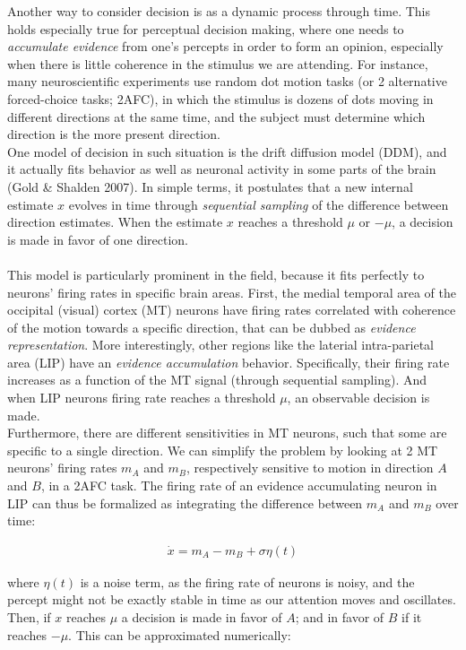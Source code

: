 \documentclass{article}
\begin{document}
\indent\indent Another way to consider decision is as a dynamic process through time. This holds especially true for perceptual decision making, where one needs to \textit{accumulate evidence} from one's percepts in order to form an opinion, especially when there is little coherence in the stimulus we are attending. For instance, many neuroscientific experiments use random dot motion tasks (or 2 alternative forced-choice tasks; 2AFC), in which the stimulus is dozens of dots moving in different directions at the same time, and the subject must determine which direction is the more present direction.
\\
\indent One model of decision in such situation is the drift diffusion model (DDM), and it actually fits behavior as well as neuronal activity in some parts of the brain (Gold \& Shalden 2007). In simple terms, it postulates that a new internal estimate $x$ evolves in time through \textit{sequential sampling} of the difference between direction estimates. When the estimate $x$ reaches a threshold $\mu$ or $-\mu$, a decision is made in favor of one direction.
\\ \\
\indent This model is particularly prominent in the field, because it fits perfectly to neurons' firing rates in specific brain areas. First, the medial temporal area of the occipital (visual) cortex (MT) neurons have firing rates correlated with coherence of the motion towards a specific direction, that can be dubbed as \textit{evidence representation}. More interestingly, other regions like the laterial intra-parietal area (LIP) have an \textit{evidence accumulation} behavior. Specifically, their firing rate increases as a function of the MT signal (through sequential sampling). And when LIP neurons firing rate reaches a threshold $\mu$, an observable decision is made.
\\
\indent Furthermore, there are different sensitivities in MT neurons, such that some are specific to a single direction. We can simplify the problem by looking at 2 MT neurons' firing rates $m_A$ and $m_B$, respectively sensitive to motion in direction $A$ and $B$, in a 2AFC task. The firing rate of an evidence accumulating neuron in LIP can thus be formalized as integrating the difference between $m_A$ and $m_B$ over time:

\begin{align*}
\dot{x} = m_A - m_B + \sigma \eta(t)
\end{align*}

\noindent where $\eta(t)$ is a noise term, as the firing rate of neurons is noisy, and the percept might not be exactly stable in time as our attention moves and oscillates. Then, if $x$ reaches $\mu$ a decision is made in favor of $A$; and in favor of $B$ if it reaches $-\mu$. This can be approximated numerically:
\end{document}
